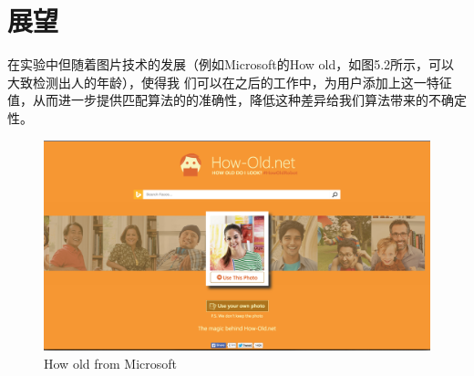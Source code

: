 \section{展望}
在实验中但随着图片技术的发展（例如Microsoft的How old，如图5.2所示，可以大致检测出人的年龄），使得我	们可以在之后的工作中，为用户添加上这一特征值，从而进一步提供匹配算法的的准确性，降低这种差异给我们算法带来的不确定性。
\begin{figure}[h]
\begin{minipage}[t]{\linewidth}
\centering
\includegraphics[width=\textwidth]{img/chap5/how_old.png}
\caption{How old from Microsoft\label{Face++API}}
\end{minipage}
\end{figure}




